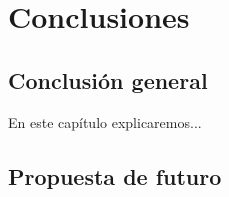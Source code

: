  \chapter{Conclusiones}\label{cap:implementacion}

\section{Conclusión general}
En este capítulo explicaremos...

\section {Propuesta de futuro}
